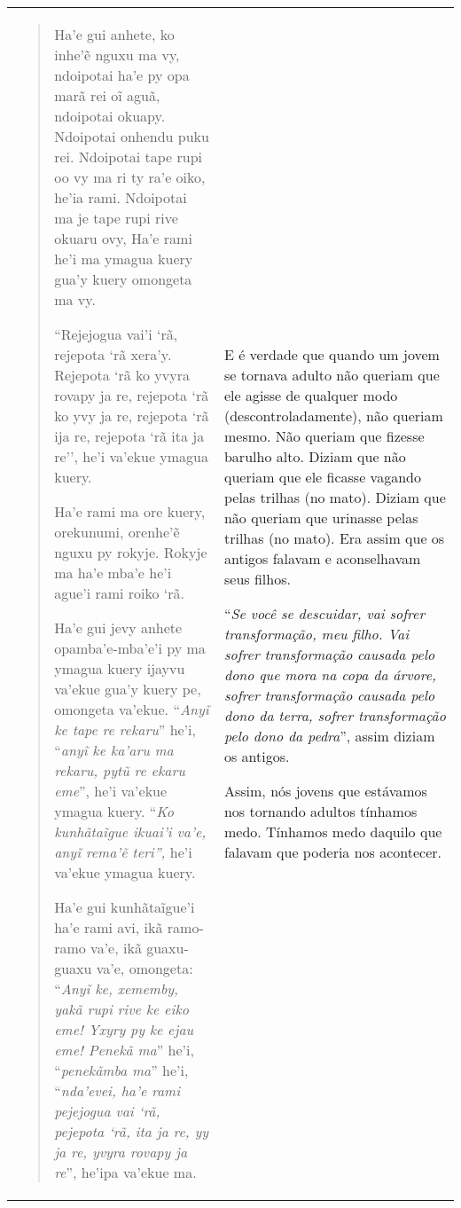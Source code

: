 \begin{longtable}[]{@{}ll@{}}
\toprule
\begin{minipage}[t]{0.48\columnwidth}\raggedright\strut
\begin{quote}
Ha'e gui anhete, ko inhe'ẽ nguxu ma vy, ndoipotai ha'e py opa marã rei
oĩ aguã, ndoipotai okuapy. Ndoipotai onhendu puku rei. Ndoipotai tape
rupi oo vy ma ri ty ra'e oiko, he'ia rami. Ndoipotai ma je tape rupi
rive okuaru ovy, Ha'e rami he'i ma ymagua kuery gua'y kuery omongeta ma
vy.

``Rejejogua vai'i `rã, rejepota `rã xera'y. Rejepota `rã ko yvyra rovapy
ja re, rejepota `rã ko yvy ja re, rejepota `rã ija re, rejepota `rã ita
ja re'', he'i va'ekue ymagua kuery.

Ha'e rami ma ore kuery, orekunumi, orenhe'ẽ nguxu py rokyje. Rokyje ma
ha'e mba'e he'i ague'i rami roiko `rã.

Ha'e gui jevy anhete opamba'e-mba'e'i py ma ymagua kuery ijayvu va'ekue
gua'y kuery pe, omongeta va'ekue. ``\emph{Anyĩ ke tape re rekaru}''
he'i, ``\emph{anyĩ ke ka'aru ma rekaru, pytũ re ekaru eme}'', he'i
va'ekue ymagua kuery. ``\emph{Ko kunhãtaĩgue ikuai'i va'e, anyĩ rema'ẽ
teri'',} he'i va'ekue ymagua kuery.

Ha'e gui kunhãtaĩgue'i ha'e rami avi, ikã ramo-ramo va'e, ikã
guaxu-guaxu va'e, omongeta: ``\emph{Anyĩ ke, xememby, yakã rupi rive ke
eiko eme! Yxyry py ke ejau eme! Penekã ma}'' he'i, ``\emph{penekãmba
ma}'' he'i, ``\emph{nda'evei, ha'e rami pejejogua vai `rã, pejepota `rã,
ita ja re, yy ja re, yvyra rovapy ja re}'', he'ipa va'ekue ma.
\end{quote}\strut
\end{minipage} & \begin{minipage}[t]{0.48\columnwidth}\raggedright\strut
E é verdade que quando um jovem se tornava adulto não queriam que ele
agisse de qualquer modo (descontroladamente), não queriam mesmo. Não
queriam que fizesse barulho alto. Diziam que não queriam que ele ficasse
vagando pelas trilhas (no mato). Diziam que não queriam que urinasse
pelas trilhas (no mato). Era assim que os antigos falavam e aconselhavam
seus filhos.

``\emph{Se você se descuidar, vai sofrer transformação, meu filho. Vai
sofrer transformação causada pelo dono que mora na copa da árvore,
sofrer transformação causada pelo dono da terra, sofrer transformação
pelo dono da pedra}'', assim diziam os antigos.

Assim, nós jovens que estávamos nos tornando adultos tínhamos medo.
Tínhamos medo daquilo que falavam que poderia nos acontecer.


\end{minipage}
\end{longtable}

